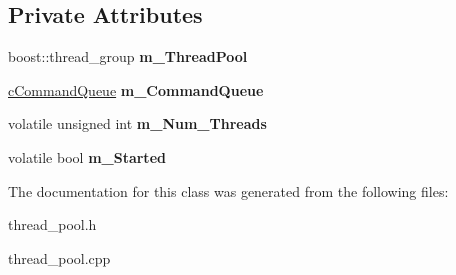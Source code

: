 \subsection*{\-Private \-Attributes}
\begin{DoxyCompactItemize}
\item 
\hypertarget{classengine_1_1cThreadPool_ae0439f245252951c72e929fcb5f12ea7}{
boost\-::thread\-\_\-group {\bfseries m\-\_\-\-Thread\-Pool}}
\label{classengine_1_1cThreadPool_ae0439f245252951c72e929fcb5f12ea7}

\item 
\hypertarget{classengine_1_1cThreadPool_a9e8295a610871d54220f068d447e4b3d}{
\hyperlink{classengine_1_1cCommandQueue}{c\-Command\-Queue} {\bfseries m\-\_\-\-Command\-Queue}}
\label{classengine_1_1cThreadPool_a9e8295a610871d54220f068d447e4b3d}

\item 
\hypertarget{classengine_1_1cThreadPool_a5a9ba1d9f84c6edf6312c358973c1e75}{
volatile unsigned int {\bfseries m\-\_\-\-Num\-\_\-\-Threads}}
\label{classengine_1_1cThreadPool_a5a9ba1d9f84c6edf6312c358973c1e75}

\item 
\hypertarget{classengine_1_1cThreadPool_a665b990bbfe85aa6dd9be2691373e2d7}{
volatile bool {\bfseries m\-\_\-\-Started}}
\label{classengine_1_1cThreadPool_a665b990bbfe85aa6dd9be2691373e2d7}

\end{DoxyCompactItemize}


\-The documentation for this class was generated from the following files\-:\begin{DoxyCompactItemize}
\item 
thread\-\_\-pool.\-h\item 
thread\-\_\-pool.\-cpp\end{DoxyCompactItemize}
